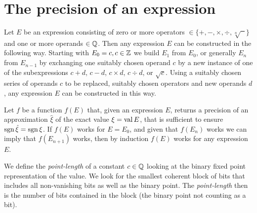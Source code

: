 %
%
\pagebreak
\section{The precision of an expression}

Let $E$ be an expression consisting of zero or more operators
$\in\{+, -, \times, \div, \sqrt[n]{\phantom{x}}\}$ and one or 
more operands $\in\mathbb{Q}$. Then any expression $E$ can be constructed 
in the following way. Starting with $E_0=c, c\in\mathbb{Z}$ 
we build $E_1$ from $E_0$, or generally $E_n$ from $E_{n-1}$ by
exchanging one suitably chosen operand $c$ by a new instance 
of one of the subexpressions
$c+d$, $c-d$, $c\times d$, $c\div d$, or $\sqrt c$. 
Using a suitably chosen series of operands $c$ to be replaced,
suitably chosen operators and new operands $d$, 
any expression $E$ can be constructed in this way.

Let $f$ be a function $f(E)$ that, given an expression $E$,
returns a precision of an approximation $\hat\xi$
of the exact value $\xi=\mathop{\rm val}\nolimits E$, 
that is sufficient to ensure $\operatorname{sgn}\hat\xi=\operatorname{sgn}\xi$.
If $f(E)$ works for $E=E_0$, 
and given that $f(E_n)$ works
we can imply that $f(E_{n+1})$ works,
then by induction $f(E)$ works for any expression $E$.

We define the {\em point-length} of a constant $c\in\mathbb{Q}$ 
looking at the binary fixed point representation 
of the value.
We look for the smallest coherent block of bits 
that includes all non-vanishing bits as well as the
binary point. The {\em point-length} then is the
number of bits contained in the block (the binary point
not counting as a bit).

